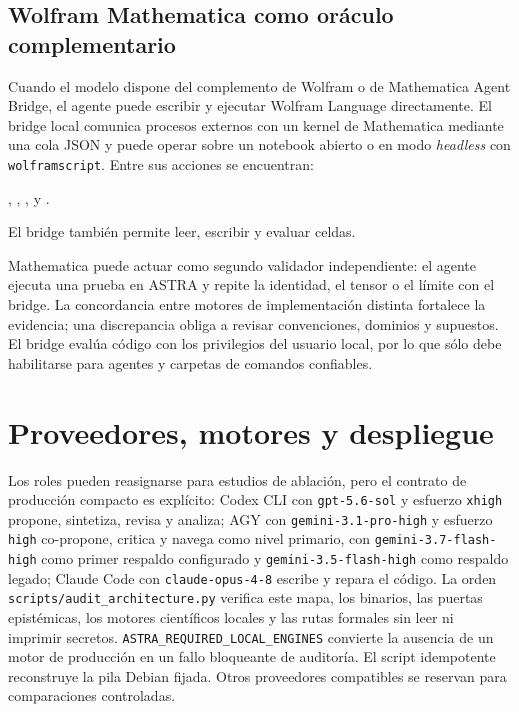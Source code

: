 \documentclass[11pt,a4paper]{article}
\begin{document}
\subsection{Wolfram Mathematica como oráculo complementario}

Cuando el modelo dispone del complemento de Wolfram o de Mathematica Agent Bridge, el agente puede escribir y ejecutar Wolfram Language directamente. El bridge local comunica procesos externos con un kernel de Mathematica mediante una cola JSON y puede operar sobre un notebook abierto o en modo \textit{headless} con \texttt{wolframscript}. Entre sus acciones se encuentran:

\begin{center}
, , ,
 y .
\end{center}

El bridge también permite leer, escribir y evaluar celdas.

Mathematica puede actuar como segundo validador independiente: el agente ejecuta una prueba en ASTRA y repite la identidad, el tensor o el límite con el bridge. La concordancia entre motores de implementación distinta fortalece la evidencia; una discrepancia obliga a revisar convenciones, dominios y supuestos. El bridge evalúa código con los privilegios del usuario local, por lo que sólo debe habilitarse para agentes y carpetas de comandos confiables.

\section{Proveedores, motores y despliegue}

Los roles pueden reasignarse para estudios de ablación, pero el contrato de producción compacto es explícito: Codex CLI con \texttt{gpt-5.6-sol} y esfuerzo \texttt{xhigh} propone, sintetiza, revisa y analiza; AGY con \texttt{gemini-3.1-pro-high} y esfuerzo \texttt{high} co-propone, critica y navega como nivel primario, con \texttt{gemini-3.7-flash-high} como primer respaldo configurado y \texttt{gemini-3.5-flash-high} como respaldo legado; Claude Code con \texttt{claude-opus-4-8} escribe y repara el código. La orden \texttt{scripts/audit\_architecture.py} verifica este mapa, los binarios, las puertas epistémicas, los motores científicos locales y las rutas formales sin leer ni imprimir secretos. \texttt{ASTRA\_REQUIRED\_LOCAL\_ENGINES} convierte la ausencia de un motor de producción en un fallo bloqueante de auditoría. El script idempotente  reconstruye la pila Debian fijada. Otros proveedores compatibles se reservan para comparaciones controladas.
\end{document}
